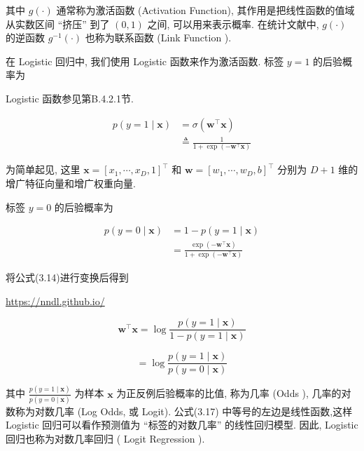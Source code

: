 \documentclass[10pt]{article}
\begin{document}
其中 $g(\cdot)$ 通常称为激活函数 (Activation Function), 其作用是把线性函数的值域从实数区间 “挤压” 到了 $(0,1)$ 之间, 可以用来表示概率. 在统计文献中, $g(\cdot)$ 的逆函数 $g^{-1}(\cdot)$ 也称为联系函数 (Link Function ).

在 Logistic 回归中, 我们使用 Logistic 函数来作为激活函数. 标签 $y=1$ 的后验概率为

Logistic 函数参见第B.4.2.1节.


\begin{align*}
p(y=1 \mid \boldsymbol{x}) & =\sigma\left(\boldsymbol{w}^{\top} \boldsymbol{x}\right)  \tag{3.13}\\
& \triangleq \frac{1}{1+\exp \left(-\boldsymbol{w}^{\top} \boldsymbol{x}\right)} \tag{3.14}
\end{align*}


为简单起见, 这里 $\boldsymbol{x}=\left[x_{1}, \cdots, x_{D}, 1\right]^{\top}$ 和 $\boldsymbol{w}=\left[w_{1}, \cdots, w_{D}, b\right]^{\top}$ 分别为 $D+1$ 维的增广特征向量和增广权重向量.

标签 $y=0$ 的后验概率为


\begin{align*}
p(y=0 \mid \boldsymbol{x}) & =1-p(y=1 \mid \boldsymbol{x})  \tag{3.15}\\
& =\frac{\exp \left(-\boldsymbol{w}^{\top} \boldsymbol{x}\right)}{1+\exp \left(-\boldsymbol{w}^{\top} \boldsymbol{x}\right)} \tag{3.16}
\end{align*}


将公式(3.14)进行变换后得到

\href{https://nndl.github.io/}{https://nndl.github.io/}


\begin{equation*}
\boldsymbol{w}^{\top} \boldsymbol{x}=\log \frac{p(y=1 \mid \boldsymbol{x})}{1-p(y=1 \mid \boldsymbol{x})} \tag{3.17}
\end{equation*}



\begin{equation*}
=\log \frac{p(y=1 \mid \boldsymbol{x})}{p(y=0 \mid \boldsymbol{x})} \tag{3.18}
\end{equation*}


其中 $\frac{p(y=1 \mid \boldsymbol{x})}{p(y=0 \mid \boldsymbol{x})}$ 为样本 $\boldsymbol{x}$ 为正反例后验概率的比值, 称为几率 (Odds ), 几率的对数称为对数几率 (Log Odds, 或 Logit). 公式(3.17) 中等号的左边是线性函数,这样 Logistic 回归可以看作预测值为 “标签的对数几率” 的线性回归模型. 因此, Logistic 回归也称为对数几率回归 ( Logit Regression ).
\end{document}

